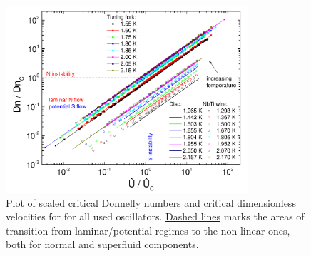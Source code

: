 \begin{figure}[h]
	\centering
	\includegraphics[width=0.8\textwidth]{graphics/results/flow_phase_diagram}
	\caption{Plot of scaled critical Donnelly numbers and critical dimensionless velocities for for all used oscillators. \underline{Dashed lines} marks the areas of transition from laminar/potential regimes to the non-linear ones, both for normal and superfluid components. }
	\label{flow_phase}
\end{figure}

\newpage
